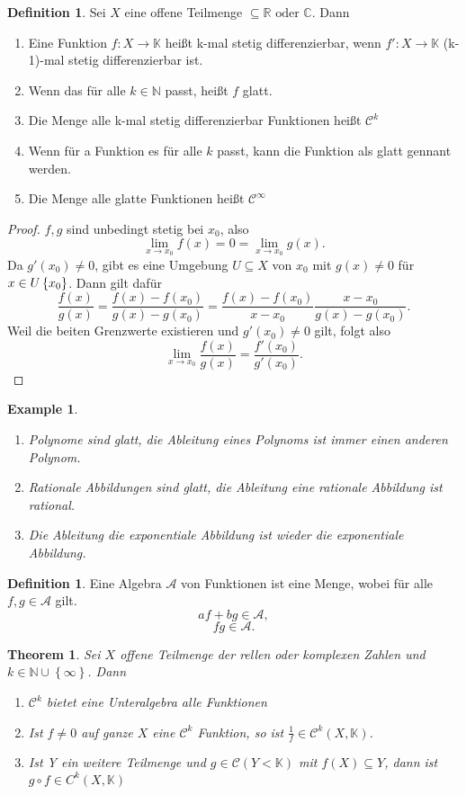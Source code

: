 \documentclass[prb,12pt]{revtex4-2}
\newtheorem{Proposition}{Theorem}
\newtheorem{Example}[Theorem]{Example}
\theoremstyle{definition}
\theoremstyle{definition}
\newtheorem{Definition}[Theorem]{Definition}
\newcommand{\R}{\mathbb{R}}
\newcommand{\C}{\mathbb{C}}
\begin{document}
\begin{Definition}
	Sei $X$ eine offene Teilmenge $\subseteq \R\text{ oder }\C$. Dann
	\begin{enumerate}
		\item Eine Funktion $f:X\to \mathbb{K}$ heißt k-mal stetig differenzierbar, wenn $f':X\to \mathbb{K}$ (k-1)-mal stetig differenzierbar ist.
		\item Wenn das f\"{u}r alle $k\in \mathbb{N}$ passt, heißt $f$ glatt.
		\item Die Menge alle k-mal stetig differenzierbar Funktionen heißt $\mathcal{C}^k$
		\item Wenn f\"{u}r a Funktion es f\"{u}r alle $k$ passt, kann die Funktion als glatt gennant werden.
		\item Die Menge alle glatte Funktionen heißt $\mathcal{C}^\infty$
	\end{enumerate}
\end{Definition}
\begin{proof}
	$f,g$ sind unbedingt stetig bei $x_0$, also
	\[
	\lim_{x \to x_0} f(x)=0=\lim_{x \to x_0} g(x)
	.\] 
	Da $g'(x_0)\neq 0$, gibt es eine Umgebung $U\subseteq X$ von $x_0$ mit $g(x)\neq 0$ f\"{u}r $x\in U\\ \left\{ x_0 \right\} $. Dann gilt daf\"{u}r
	\[
		\frac{f(x)}{g(x)}=\frac{f(x)-f(x_0)}{g(x)-g(x_0)}=\frac{f(x)-f(x_0)}{x-x_0}\frac{x-x_0}{g(x)-g(x_0)}
	.\] 
Weil die beiten Grenzwerte existieren und $g'(x_0)\neq 0$ gilt, folgt also
\[
\lim_{x \to x_0} \frac{f(x)}{g(x)}=\frac{f'(x_0)}{g'(x_0)}
.\] 
\end{proof}
\begin{Example}
	\begin{enumerate}
		\item Polynome sind glatt, die Ableitung eines Polynoms ist immer einen anderen Polynom.
		\item Rationale Abbildungen sind glatt, die Ableitung eine rationale Abbildung ist rational.
		\item Die Ableitung die exponentiale Abbildung ist wieder die exponentiale Abbildung.
	\end{enumerate}
\end{Example}

\begin{Definition}
	Eine Algebra $\mathcal{A}$ von Funktionen ist eine Menge, wobei f\"{u}r alle $f,g\in \mathcal{A}$ gilt.
 \[
	 af+bg\in \mathcal{A},\]
	 \[
		 fg\in \mathcal{A}
	 .\] 
\end{Definition}

\begin{Proposition}
	Sei $X$ offene Teilmenge der rellen oder komplexen Zahlen und $k\in\mathbb{N}\cup \left\{ \infty \right\} $. Dann
	\begin{enumerate}
		\item $\mathcal{C}^k$ bietet eine Unteralgebra alle Funktionen
		\item Ist $f\neq 0$ auf ganze $X$ eine $\mathcal{C}^k$ Funktion, so ist $\frac{1}{f}\in \mathcal{C}^k (X, \mathbb{K})$.
		\item Ist Y ein weitere Teilmenge und $g\in \mathcal{C}(Y< \mathbb{K})$ mit $f(X)\subseteq Y$, dann ist $g\circ f \in C^k(X, \mathbb{K})$
	\end{enumerate}
\end{Proposition}
\end{document}
